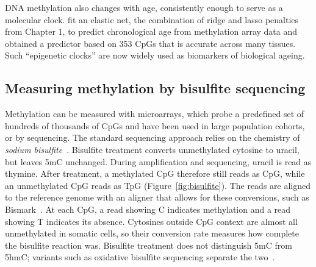 DNA methylation also changes with age, consistently enough to serve as a molecular clock. \citet{horvath2013} fit an elastic net, the combination of ridge and lasso penalties from Chapter 1, to predict chronological age from methylation array data and obtained a predictor based on 353 CpGs that is accurate across many tissues. Such ``epigenetic clocks'' are now widely used as biomarkers of biological ageing.

\subsection{Measuring methylation by bisulfite sequencing}

Methylation can be measured with microarrays, which probe a predefined set of hundreds of thousands of CpGs and have been used in large population cohorts, or by sequencing. The standard sequencing approach relies on the chemistry of \emph{sodium bisulfite}~\citep{frommer1992}. Bisulfite treatment converts unmethylated cytosine to uracil, but leaves 5mC unchanged. During amplification and sequencing, uracil is read as thymine. After treatment, a methylated CpG therefore still reads as CpG, while an unmethylated CpG reads as TpG (Figure~\ref{fig:bisulfite}). The reads are aligned to the reference genome with an aligner that allows for these conversions, such as Bismark~\citep{krueger2011}. At each CpG, a read showing C indicates methylation and a read showing T indicates its absence. Cytosines outside CpG context are almost all unmethylated in somatic cells, so their conversion rate measures how complete the bisulfite reaction was. Bisulfite treatment does not distinguish 5mC from 5hmC; variants such as oxidative bisulfite sequencing separate the two~\citep{booth2012}.

